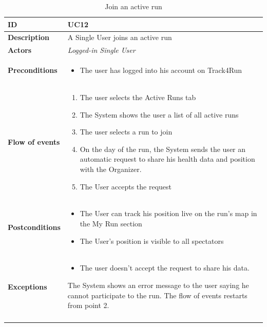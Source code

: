 \documentclass[titlepage]{article}
\begin{document}
 \begin{longtable}{| p{3 cm} | p{10 cm} |} 
			\hline
			{\bf ID} & UC12 \\
			\hline
			{\bf Description} & A Single User joins an active run  \\
			\hline
			{\bf Actors} & {\it Logged-in Single User }\\
			\hline
			{\bf Preconditions} & 		
							\begin{itemize}
								\item The user has logged into his account on Track4Run
							\end{itemize}
			\\
			\hline
			{\bf Flow of events} & 
							\begin{enumerate}
								\item The user selects the Active Runs tab
\item The System shows the user a list of all active runs 
\item The user selects a run to join
\item On the day of the run, the System sends the user an automatic request to share his health data and position with the Organizer.
\item The User accepts the request
							\end{enumerate}			
			 \\
			\hline
			{\bf Postconditions} & 
							\begin{itemize}
								\item The User can track his position live on the run’s map in the My Run section
\item The User’s position is visible to all spectators 
							\end{itemize}
			\\
			\hline
			{\bf Exceptions} & 
							\begin{itemize}
								\item The user doesn’t accept the request to share his data.
							\end{itemize}
							The System shows an error message to the user saying he cannot participate to the run. The flow of events restarts from point 2.						
			\\
			\hline
			\caption{Join an active run}
			\end{longtable}
\end{document}
